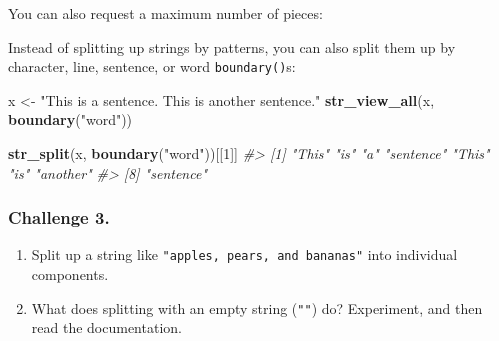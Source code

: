 \documentclass[
]{book}
\newenvironment{Shaded}{\begin{snugshade}}{\end{snugshade}}
\newcommand{\CommentTok}[1]{\textcolor[rgb]{0.56,0.35,0.01}{\textit{#1}}}
\newcommand{\DataTypeTok}[1]{\textcolor[rgb]{0.13,0.29,0.53}{#1}}
\newcommand{\DecValTok}[1]{\textcolor[rgb]{0.00,0.00,0.81}{#1}}
\newcommand{\KeywordTok}[1]{\textcolor[rgb]{0.13,0.29,0.53}{\textbf{#1}}}
\newcommand{\NormalTok}[1]{#1}
\newcommand{\OperatorTok}[1]{\textcolor[rgb]{0.81,0.36,0.00}{\textbf{#1}}}
\newcommand{\OtherTok}[1]{\textcolor[rgb]{0.56,0.35,0.01}{#1}}
\newcommand{\StringTok}[1]{\textcolor[rgb]{0.31,0.60,0.02}{#1}}
\begin{document}
You can also request a maximum number of pieces:

\begin{Shaded}
\end{Shaded}

Instead of splitting up strings by patterns, you can also split them up by character, line, sentence, or word \texttt{boundary()}s:

\begin{Shaded}
\begin{Highlighting}[]
\NormalTok{x <-}\StringTok{ "This is a sentence.  This is another sentence."}
\KeywordTok{str_view_all}\NormalTok{(x, }\KeywordTok{boundary}\NormalTok{(}\StringTok{"word"}\NormalTok{))}
\end{Highlighting}
\end{Shaded}

\hypertarget{htmlwidget-21c7483268bafca56cec}{}

\begin{Shaded}
\begin{Highlighting}[]
\KeywordTok{str_split}\NormalTok{(x, }\KeywordTok{boundary}\NormalTok{(}\StringTok{"word"}\NormalTok{))[[}\DecValTok{1}\NormalTok{]]}
\CommentTok{#> [1] "This"     "is"       "a"        "sentence" "This"     "is"       "another" }
\CommentTok{#> [8] "sentence"}
\end{Highlighting}
\end{Shaded}

\hypertarget{challenge-3.-8}{%
\subsubsection*{Challenge 3.}\label{challenge-3.-8}}

\begin{enumerate}
\def\labelenumi{\arabic{enumi}.}
\item
  Split up a string like \texttt{"apples,\ pears,\ and\ bananas"} into individual
  components.
\item
  What does splitting with an empty string (\texttt{""}) do? Experiment, and
  then read the documentation.
\end{enumerate}
\end{document}
